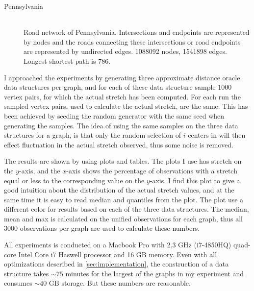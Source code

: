 \begin{description}
\begin{description}
        \item[Pennsylvania] \hfill \\
                Road network of Pennsylvania. Intersections and endpoints are
                represented by nodes and the roads connecting these
                intersections or road endpoints are represented by undirected
                edges. 1088092 nodes, 1541898 edges. Longest shortest path is
                786.
        \end{description}

\end{description}

I approached the experiments by generating three approximate distance oracle
data structures per graph, and for each of these data structure sample $1000$
vertex pairs, for which the actual stretch has been computed. For each run
the sampled vertex pairs, used to calculate the actual stretch, are the same.
This has been achieved by seeding the random generator with the same seed when
generating the samples. The idea of using the same samples on the three data
structures for a graph, is that only the random selection of $i$-centers in
 will then effect fluctuation in the actual stretch observed,
thus some noise is removed.

The results are shown by using plots and tables. The plots I use has stretch
on the $y$-axis, and the $x$-axis shows the percentage of observations with a
stretch equal or less to the corresponding value on the $y$-axis.
I find this plot to give a good intuition about the distribution of the
actual stretch values, and at the same time it is easy to read median and
quantiles from the plot. The plot use a different color for results based
on each of the three data structures. The median, mean and max is calculated
on the unified observations for each graph, thus all 3000 observations per
graph are used to calculate these numbers.

All experiments is conducted on a Macbook Pro with 2.3 GHz (i7-4850HQ)
quad-core Intel Core i7 Haswell processor and 16 GB memory. 
Even with all optimizations described in \autoref{sec:implementation}, the
construction of a data structure takes $\sim75$ minutes for the largest of the
graphs in my experiment and consumes $\sim40$ GB storage. But these numbers are
reasonable.

